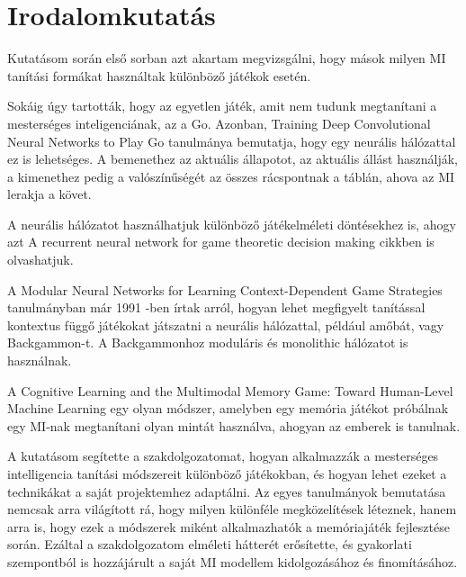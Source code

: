 \chapter{Irodalomkutatás}

\thispagestyle{fancy}
\pagestyle{fancy}

Kutatásom során első sorban azt akartam megvizsgálni, hogy mások milyen MI tanítási formákat használtak különböző játékok esetén. 

Sokáig úgy tartották, hogy az egyetlen játék, amit nem tudunk megtanítani a mesterséges inteligenciának, az a Go. Azonban, Training Deep Convolutional Neural Networks to Play Go tanulmánya \cite{pmlr-v37-clark15} bemutatja,
 hogy egy neurális hálózattal ez is lehetséges. A bemenethez az aktuális állapotot, az aktuális állást használják, a kimenethez pedig a valószínűségét az összes rácspontnak a táblán, ahova az MI lerakja a követ. 

 A neurális hálózatot használhatjuk különböző játékelméleti döntésekhez is, ahogy azt A recurrent neural network for game theoretic decision making \cite{bhatia2014recurrent} cikkben is olvashatjuk. 

A Modular Neural Networks for Learning Context-Dependent Game Strategies \cite{boyan1992modular} tanulmányban már 1991 -ben írtak arról, hogyan lehet megfigyelt tanítással kontextus függő játékokat játszatni a neurális hálózattal, például amőbát, vagy Backgammon-t. A Backgammonhoz moduláris és monolithic hálózatot is használnak. 

A Cognitive Learning and the Multimodal Memory Game: Toward Human-Level Machine Learning \cite{4634261} egy olyan módszer, amelyben egy memória játékot próbálnak egy MI-nak megtanítani olyan mintát használva, ahogyan az emberek is tanulnak.

A kutatásom segítette a szakdolgozatomat, hogyan alkalmazzák a mesterséges intelligencia tanítási módszereit különböző játékokban, és hogyan lehet ezeket a technikákat a saját projektemhez adaptálni. Az egyes tanulmányok bemutatása nemcsak arra világított rá, hogy milyen különféle megközelítések léteznek, hanem arra is, hogy ezek a módszerek miként alkalmazhatók a memóriajáték fejlesztése során. Ezáltal a szakdolgozatom elméleti hátterét erősítette, és gyakorlati szempontból is hozzájárult a saját MI modellem kidolgozásához és finomításához.